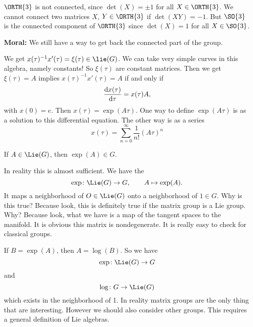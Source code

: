 \begin{ex}
$\ORTH{3}$ is not connected, since $\det(X)=\pm1$ for all
  $X\in\ORTH{3}$. We cannot connect two matrices $X$, $Y\in\ORTH{3}$ if
  $\det(XY)=-1$. But $\SO{3}$ is the connected component of
  $\ORTH{3}$ since $\det(X)=1$ for all $X\in\SO{3}$.
\end{ex}

\medbreak
\noindent\textbf{Moral:} We still have a way to get back the
connected part of the group.
\medbreak

We get $x(\tau)^{-1}x'(\tau)=\xi(\tau)\in\lie(G)$. We can take
very simple curves in this algebra, namely constants! So
$\xi(\tau)$ are constant matrices. Then we get $\xi(\tau)=A$
implies $x(\tau)^{-1}x'(\tau)=A$ if and only if
\begin{equation}
\frac{\mathrm{d} x(\tau)}{\mathrm{d} \tau}=x(\tau)A,
\end{equation}
with $x(0)=e$. Then $x(\tau)=\exp(A\tau)$. One way to define
$\exp(A\tau)$ is as a solution to this differential equation. The
other way is as a series
\begin{equation}
x(\tau)=\sum^{\infty}_{n=0}\frac{1}{n!}(A\tau)^{n}
\end{equation}

\begin{cor}
If $A\in\Lie(G)$, then $\exp(A)\in G$.
\end{cor}
\medbreak

In reality this is almost sufficient. We have the
\begin{equation}
\exp\colon\Lie(G)\to G,\qquad A\mapsto\exp(A).
\end{equation}
It maps a neighborhood of $O\in\Lie(G)$ onto a neighborhood of
$1\in G$. Why is this true? Because look, this is definitely true
if the matrix group is a Lie group. Why? Because look, what we
have is a map of the tangent spaces to the manifold. It is
obvious this matrix is nondegenerate. It is really easy to check
for classical groups.

If $B=\exp(A)$, then $A=\log(B)$. So we have
\begin{equation}
\exp\colon\Lie(G)\to G
\end{equation}
and 
\begin{equation}
\log\colon G\to\Lie(G)
\end{equation}
which exists in the neighborhood of 1. In reality matrix groups
are the only thing that are interesting. However we should also
consider other groups. This requires a general definition of Lie
algebras. 

